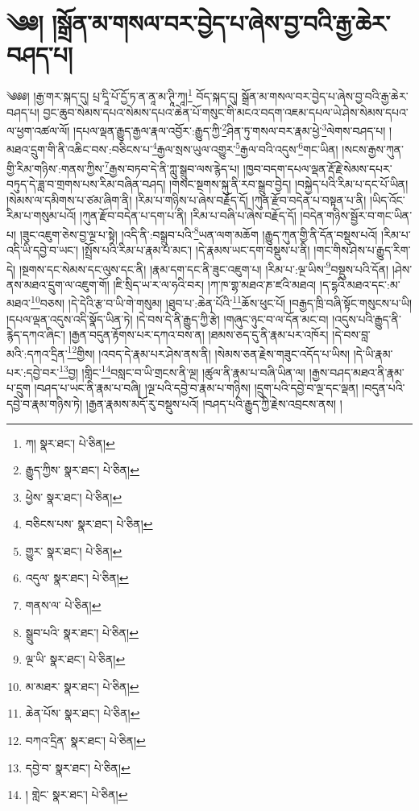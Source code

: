 \setcounter{footnote}{0} 
\chapter{༄༅། །སྒྲོན་མ་གསལ་བར་བྱེད་པ་ཞེས་བྱ་བའི་རྒྱ་ཆེར་བཤད་པ།}༄༅༅། །རྒྱ་གར་སྐད་དུ། པྲ་དཱི་པོ་དྱོ་ཏ་ན་ནཱ་མ་ཊཱི་ཀཱ།\footnote{ཀ།  སྣར་ཐང་།  པེ་ཅིན། } བོད་སྐད་དུ། སྒྲོན་མ་གསལ་བར་བྱེད་པ་ཞེས་བྱ་བའི་རྒྱ་ཆེར་བཤད་པ། བྱང་ཆུབ་སེམས་དཔའ་སེམས་དཔའ་ཆེན་པོ་གསུང་གི་མངའ་བདག་འཇམ་དཔལ་ཡེ་ཤེས་སེམས་དཔའ་ལ་ཕྱག་འཚལ་ལོ། །དཔལ་ལྡན་རྒྱུད་རྒྱལ་རྣལ་འབྱོར་:རྒྱུད་ཀྱི་\footnote{རྒྱུད་ཀྱིས་  སྣར་ཐང་།  པེ་ཅིན། }ཤིན་ཏུ་གསལ་བར་རྣམ་ཕྱེ་\footnote{ཕྱེས་  སྣར་ཐང་།  པེ་ཅིན། }ལེགས་བཤད་པ། །མཐའ་དྲུག་གི་ནི་འཆིང་བས་:བཅིངས་པ་\footnote{བཅིངས་པས་  སྣར་ཐང་།  པེ་ཅིན། }རྒྱལ་སྲས་ཡུལ་འགྱུར་\footnote{གྱུར་  སྣར་ཐང་།  པེ་ཅིན། }རྒྱལ་བའི་འདུས་\footnote{འདུལ་  སྣར་ཐང་།  པེ་ཅིན། }གང་ཡིན། །སངས་རྒྱས་ཀུན་གྱི་རིམ་གཉིས་:གནས་ཀྱིས་\footnote{གནས་ལ་  པེ་ཅིན། }རྒྱས་བཏབ་དེ་ནི་ཀླུ་སྒྲུབ་ལས་རྙེད་པ། །ཁྱབ་བདག་དཔལ་ལྡན་རྡོ་རྗེ་སེམས་དཔར་བཏུད་དེ་ཟླ་བ་གྲགས་པས་རིམ་བཞིན་བཤད། །གསང་སྔགས་སྐུ་ནི་རབ་སྒྲུབ་བྱེད། །བསྐྱེད་པའི་རིམ་པ་དང་པོ་ཡིན། །སེམས་ལ་དམིགས་པ་ཙམ་ཞིག་ནི། །རིམ་པ་གཉིས་པ་ཞེས་བརྗོད་དོ། །ཀུན་རྫོབ་བདེན་པ་བསྟན་པ་ནི། །ཡིད་འོང་རིམ་པ་གསུམ་པའོ། །ཀུན་རྫོབ་བདེན་པ་དག་པ་ནི། །རིམ་པ་བཞི་པ་ཞེས་བརྗོད་དོ། །བདེན་གཉིས་སྦྱོར་བ་གང་ཡིན་པ། །ཟུང་འཇུག་ཅེས་བྱ་ལྔ་པ་སྟེ། །འདི་ནི་:བསྒྲུབ་པའི་\footnote{སྒྲུབ་པའི་  སྣར་ཐང་།  པེ་ཅིན། }ཡན་ལག་མཆོག །རྒྱུད་ཀུན་གྱི་ནི་དོན་བསྡུས་པའོ། །རིམ་པ་འདི་ཡི་དབྱེ་བ་ཡང་། །སྤྲོས་པའི་རིམ་པ་རྣམ་པ་མང་། །དེ་རྣམས་ཡང་དག་བསྡུས་པ་ནི། །གང་གིས་ཤེས་པ་རྒྱུད་རིག་དེ། །སྔགས་དང་སེམས་དང་ལུས་དང་ནི། །རྣམ་དག་དང་ནི་ཟུང་འཇུག་པ། །རིམ་པ་:ལྔ་ཡིས་\footnote{ལྔ་ཡི་  སྣར་ཐང་།  པེ་ཅིན། }བསྡུས་པའི་དོན། །ཤེས་ནས་མཐའ་དྲུག་ལ་འཇུག་གོ། །ཇི་སྲིད་ཡ་ར་ལ་ཧའི་བར། །ཀ་ཁ་གྷ་མཐའ་ཎ་ཛའི་མཐའ། །ད་དྷའི་མཐའ་དང་:མ་མཐའ་\footnote{མ་མཐར་  སྣར་ཐང་།  པེ་ཅིན། }བཅས། །དེ་དེའི་རྩ་བ་ཡི་གེ་གསུམ། །ཐུབ་པ་:ཆེན་པོའི་\footnote{ཆེན་པོས་  སྣར་ཐང་།  པེ་ཅིན། }ཆོས་ཕུང་པོ། །བརྒྱད་ཁྲི་བཞི་སྟོང་གསུངས་པ་ཡི། །དཔལ་ལྡན་འདུས་འདི་སྣོད་ཡིན་ཏེ། །དེ་བས་དེ་ནི་རྒྱུད་ཀྱི་རྩེ། །གཞུང་ཉུང་བ་ལ་དོན་མང་བ། །འདུས་པའི་རྒྱུད་ནི་རྙེད་དཀའ་ཞིང་། །རྒྱན་བདུན་རྟོགས་པར་དཀའ་བས་ན། །ཐམས་ཅད་དུ་ནི་རྣམ་པར་འཁོར། །དེ་བས་བླ་མའི་:དཀའ་དྲིན་\footnote{བཀའ་དྲིན་  སྣར་ཐང་།  པེ་ཅིན། }གྱིས། །འབད་དེ་རྣམ་པར་ཤེས་ནས་ནི། །སེམས་ཅན་རྗེས་གཟུང་འདོད་པ་ཡིས། །དེ་ཡི་རྣམ་པར་:དབྱེ་བར་\footnote{དབྱེ་བ་  སྣར་ཐང་།  པེ་ཅིན། }བྱ། །གླིང་\footnote{། གླེང་  སྣར་ཐང་།  པེ་ཅིན། }བསླང་བ་ཡི་གྲངས་ནི་ལྔ། །ཚུལ་ནི་རྣམ་པ་བཞི་ཡིན་ལ། །རྒྱས་བཤད་མཐའ་ནི་རྣམ་པ་དྲུག །བཤད་པ་ཡང་ནི་རྣམ་པ་བཞི། །ལྔ་པའི་དབྱེ་བ་རྣམ་པ་གཉིས། །དྲུག་པའི་དབྱེ་བ་ལྔ་དང་ལྡན། །བདུན་པའི་དབྱེ་བ་རྣམ་གཉིས་ཏེ། །རྒྱན་རྣམས་མདོ་རུ་བསྡུས་པའོ། །བཤད་པའི་རྒྱུད་ཀྱི་རྗེས་འབྲངས་ནས། །
